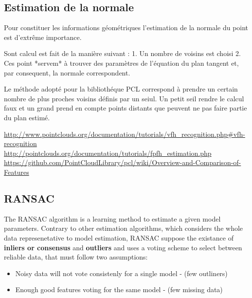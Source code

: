 \begin{figure}[H]
\end{figure}

\subsection{Estimation de la normale}

Pour constituer les informations géométriques l'estimation de la normale du point est d'extrême importance. 

Sont calcul est fait de la manière suivant :
1. Un nombre de voisins est choisi 
2. Ces point *servem* à trouver des paramètres de l'équation du plan tangent et, par consequent, la normale correspondent.

Le méthode adopté pour la bibliothéque PCL correspond à prendre un certain nombre de plus proches voisins définis par un seiul. Un petit seil rendre le calcul faux et un grand prend en compte points distants que peuvent ne pas faire partie du plan estimé.

\url{http://www.pointclouds.org/documentation/tutorials/vfh_recognition.php#vfh-recognition} \\

\url{http://pointclouds.org/documentation/tutorials/fpfh_estimation.php} \\

\url{https://github.com/PointCloudLibrary/pcl/wiki/Overview-and-Comparison-of-Features} \\

\subsection { RANSAC } 

The RANSAC algorithm is a learning method to estimate a given model parameters. Contrary to other estimation algorithms, which considers the whole data represenetative to model estimation, RANSAC suppose the existance of \textbf{inliers or consensus} and \textbf{outliers}  and uses a voting scheme to select between reliable data, that must follow two assumptions: 

\begin{itemize}
  \item Noisy data will not vote consistenly for a single model - (few outliners) 
  \item Enough good features voting for the same model - (few missing data)
\end{itemize}

